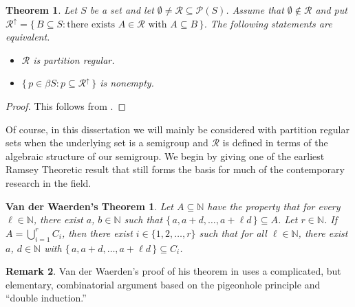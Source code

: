 \documentclass[12pt]{article}
\theoremstyle{plain}
\newtheorem{thm}{Theorem}[section]
\newtheorem*{vdw}{Van der Waerden's Theorem}
\theoremstyle{definition}
\newtheorem{rmk}[thm]{Remark}
\newcommand{\bbN}{\mathbb{N}}
\newcommand{\calP}{\mathcal{P}}
\newcommand{\calR}{\mathcal{R}}
\begin{document}
\begin{thm}
  \label{thm:pr}
  Let $S$ be a set and let $\emptyset \ne \calR \subseteq \calP(S)$.
  Assume that $\emptyset \not\in \calR$ and put $\calR^{\uparrow} =
  \{\, B \subseteq S : \mbox{there exists $A \in \calR$ with $A
    \subseteq B$} \,\}$.
  The following statements are equivalent.
  \begin{itemize}
    \item[(a)] $\calR$ is partition regular.

    \item[(b)] $\{\, p \in \beta S : p \subseteq \calR^\uparrow \,\}$
      is nonempty.
  \end{itemize}
\end{thm}
\begin{proof}
  This follows from \cite[Theorem 3.11]{Hindman:1998fk}.
\end{proof}

Of course, in this dissertation we will mainly be considered with
partition regular sets when the underlying set is a semigroup and
$\calR$ is defined in terms of the algebraic structure of our
semigroup.
We begin by giving one of the earliest Ramsey Theoretic result that
still forms the basis for much of the contemporary research in the
field.

\begin{vdw}
  Let $A \subseteq \bbN$ have the property that for every $\ell \in
  \bbN$, there exist $a$, $b \in \bbN$ such that $\{\, a, a+d, \ldots,
  a+\ell d\,\} \subseteq A$.
  Let $r \in \bbN$.
  If $A = \bigcup_{i=1}^r C_i$, then there exist $i \in \{1, 2,
  \ldots, r\}$ such that for all $\ell \in \bbN$, there exist $a$, $d
  \in \bbN$ with $\{\, a, a+d, \ldots, a+\ell d \,\} \subseteq C_i$. 
\end{vdw}

\begin{rmk}
  Van der Waerden's proof of his theorem in
  \cite{Van-der-Waerden:1927fk} uses a complicated, but elementary,
  combinatorial argument based on the pigeonhole principle and ``double
  induction.''%
\end{rmk}
\end{document}
